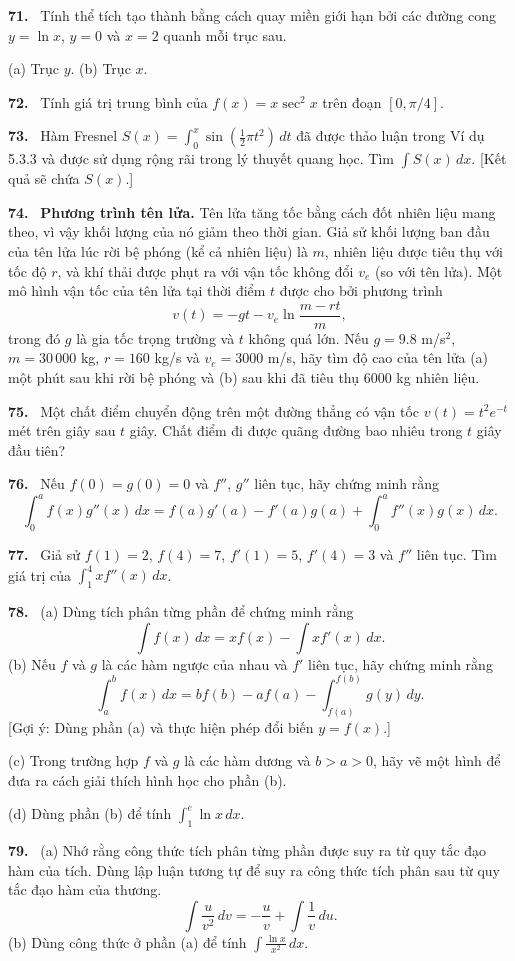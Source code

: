 \documentclass[12pt,a4paper]{article}
\newcommand{\bt}[1]{\par\smallskip\Needspace{5\baselineskip}\noindent\textbf{#1.}\ }
\begin{document}
\bt{71} Tính thể tích tạo thành bằng cách quay miền giới hạn bởi các đường cong $y=\ln x$, $y=0$ và $x=2$ quanh mỗi trục sau.

(a) Trục $y$. \qquad (b) Trục $x$.

\bt{72} Tính giá trị trung bình của $f(x)=x\sec^2x$ trên đoạn $[0,\pi/4]$.

\bt{73} Hàm Fresnel $S(x)=\int_0^x\sin\left(\frac12\pi t^2\right)\,dt$ đã được thảo luận trong Ví dụ 5.3.3 và được sử dụng rộng rãi trong lý thuyết quang học. Tìm $\int S(x)\,dx$. [Kết quả sẽ chứa $S(x)$.]

\bt{74} \textbf{Phương trình tên lửa.} Tên lửa tăng tốc bằng cách đốt nhiên liệu mang theo, vì vậy khối lượng của nó giảm theo thời gian. Giả sử khối lượng ban đầu của tên lửa lúc rời bệ phóng (kể cả nhiên liệu) là $m$, nhiên liệu được tiêu thụ với tốc độ $r$, và khí thải được phụt ra với vận tốc không đổi $v_e$ (so với tên lửa). Một mô hình vận tốc của tên lửa tại thời điểm $t$ được cho bởi phương trình
\[v(t)=-gt-v_e\ln\frac{m-rt}{m},\]
trong đó $g$ là gia tốc trọng trường và $t$ không quá lớn. Nếu $g=9.8$ m/s$^2$, $m=30\,000$ kg, $r=160$ kg/s và $v_e=3000$ m/s, hãy tìm độ cao của tên lửa (a) một phút sau khi rời bệ phóng và (b) sau khi đã tiêu thụ $6000$ kg nhiên liệu.

\bt{75} Một chất điểm chuyển động trên một đường thẳng có vận tốc $v(t)=t^2e^{-t}$ mét trên giây sau $t$ giây. Chất điểm đi được quãng đường bao nhiêu trong $t$ giây đầu tiên?

\bt{76} Nếu $f(0)=g(0)=0$ và $f''$, $g''$ liên tục, hãy chứng minh rằng
\[\int_0^a f(x)g''(x)\,dx=f(a)g'(a)-f'(a)g(a)+\int_0^a f''(x)g(x)\,dx.\]

\bt{77} Giả sử $f(1)=2$, $f(4)=7$, $f'(1)=5$, $f'(4)=3$ và $f''$ liên tục. Tìm giá trị của $\int_1^4 xf''(x)\,dx$.

\bt{78} (a) Dùng tích phân từng phần để chứng minh rằng
\[\int f(x)\,dx=xf(x)-\int xf'(x)\,dx.\]
(b) Nếu $f$ và $g$ là các hàm ngược của nhau và $f'$ liên tục, hãy chứng minh rằng
\[\int_a^b f(x)\,dx=bf(b)-af(a)-\int_{f(a)}^{f(b)}g(y)\,dy.\]
[Gợi ý: Dùng phần (a) và thực hiện phép đổi biến $y=f(x)$.]

(c) Trong trường hợp $f$ và $g$ là các hàm dương và $b>a>0$, hãy vẽ một hình để đưa ra cách giải thích hình học cho phần (b).

(d) Dùng phần (b) để tính $\int_1^e\ln x\,dx$.

\bt{79} (a) Nhớ rằng công thức tích phân từng phần được suy ra từ quy tắc đạo hàm của tích. Dùng lập luận tương tự để suy ra công thức tích phân sau từ quy tắc đạo hàm của thương.
\[\int\frac{u}{v^2}\,dv=-\frac uv+\int\frac1v\,du.\]
(b) Dùng công thức ở phần (a) để tính $\int\frac{\ln x}{x^2}\,dx$.
\end{document}
